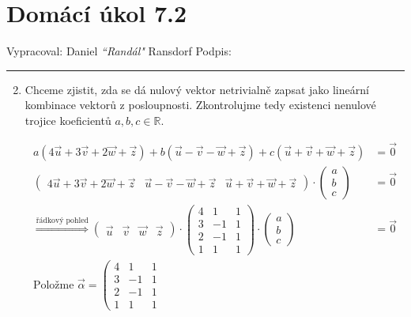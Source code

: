 \documentclass[12pt]{article}
\begin{document}
\section*{Domácí úkol 7.2}

Vypracoval: Daniel \textit{``Randál"} Ransdorf \hfill Podpis: \rule{4cm}{0.4pt}

\begin{enumerate}

  \setcounter{enumi}{1}
  
  \item Chceme zjistit, zda se dá nulový vektor netrivialně zapsat jako lineární kombinace
    vektorů z posloupnosti. Zkontrolujme tedy existenci nenulové trojice koeficientů $a,b,c\in\mathbb{R}$.

    \begin{align*}
      a(4\vec{u}+3\vec{v}+2\vec{w}+\vec{z}) + b(\vec{u}-\vec{v}-\vec{w}+\vec{z}) + c(\vec{u}+\vec{v}+\vec{w}+\vec{z}) &= \vec{0} \\
      \left(\begin{array}{ccc}
        4\vec{u}+3\vec{v}+2\vec{w}+\vec{z} & \vec{u}-\vec{v}-\vec{w}+\vec{z} & \vec{u}+\vec{v}+\vec{w}+\vec{z}
      \end{array}\right) \cdot \left(\begin{array}{c}
        a\\b\\c
      \end{array}\right) &= \vec{0} \\
      \overset{\text{řádkový pohled}}{\Longrightarrow}
      \left(\begin{array}{cccc}
        \vec{u} & \vec{v} & \vec{w} & \vec{z}
      \end{array}\right) \cdot \left(\begin{array}{ccc}
        4 & 1 & 1 \\ 3 & -1 & 1 \\ 2 & -1 & 1 \\ 1 & 1 & 1
      \end{array}\right) \cdot \left(\begin{array}{c}
        a\\b\\c
      \end{array}\right) &= \vec{0} \\
      \text{Položme } \vec{\alpha} = \left(\begin{array}{ccc}
        4 & 1 & 1 \\ 3 & -1 & 1 \\ 2 & -1 & 1 \\ 1 & 1 & 1

\end{array}
\end{align*}
\end{enumerate}
\end{document}
